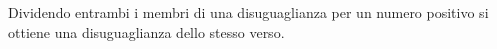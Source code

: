 Dividendo entrambi i membri di una disuguaglianza 
per un numero positivo si ottiene 
una disuguaglianza dello stesso verso. %